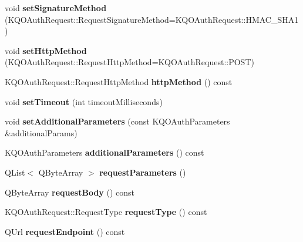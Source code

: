 \begin{DoxyCompactItemize}
void {\bfseries set\+Signature\+Method} (K\+Q\+O\+Auth\+Request\+::\+Request\+Signature\+Method=K\+Q\+O\+Auth\+Request\+::\+H\+M\+A\+C\+\_\+\+S\+H\+A1)
\item 
\mbox{\label{class_k_q_o_auth_request_a2261a473d105d3f7499641885390272a}} 
void {\bfseries set\+Http\+Method} (K\+Q\+O\+Auth\+Request\+::\+Request\+Http\+Method=K\+Q\+O\+Auth\+Request\+::\+P\+O\+ST)
\item 
\mbox{\label{class_k_q_o_auth_request_a7d616bd3887ce94b34998b6c432e7f52}} 
K\+Q\+O\+Auth\+Request\+::\+Request\+Http\+Method {\bfseries http\+Method} () const
\item 
\mbox{\label{class_k_q_o_auth_request_ad96b45465a0bee1c2a4cb9f7cd0928ff}} 
void {\bfseries set\+Timeout} (int timeout\+Milliseconds)
\item 
\mbox{\label{class_k_q_o_auth_request_a0ff590cc82f76446e23b53eda98958cb}} 
void {\bfseries set\+Additional\+Parameters} (const K\+Q\+O\+Auth\+Parameters \&additional\+Params)
\item 
\mbox{\label{class_k_q_o_auth_request_ac394eddefd8979da0f8c3e3936d2bb2c}} 
K\+Q\+O\+Auth\+Parameters {\bfseries additional\+Parameters} () const
\item 
\mbox{\label{class_k_q_o_auth_request_a14e58898ac14647dc5fa831d99079698}} 
Q\+List$<$ Q\+Byte\+Array $>$ {\bfseries request\+Parameters} ()
\item 
\mbox{\label{class_k_q_o_auth_request_a17da26da2ca4d2834e8ed490c1c8692d}} 
Q\+Byte\+Array {\bfseries request\+Body} () const
\item 
\mbox{\label{class_k_q_o_auth_request_a726fcf9317f9e59cd9d9f6f846d7f8aa}} 
K\+Q\+O\+Auth\+Request\+::\+Request\+Type {\bfseries request\+Type} () const
\item 
\mbox{\label{class_k_q_o_auth_request_ae585992d9fc297de979779591b76ab57}} 
Q\+Url {\bfseries request\+Endpoint} () const
\item 

\end{DoxyCompactItemize}
